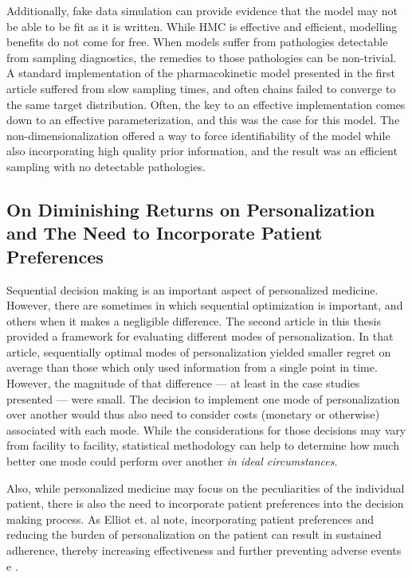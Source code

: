 Additionally, fake data simulation can provide evidence that the model may not be able to be fit as it is written.  While HMC is effective and efficient, modelling benefits do not come for free.  When models suffer from pathologies detectable from sampling diagnostics, the remedies to those pathologies can be non-trivial. A standard implementation of the pharmacokinetic model presented in the first article suffered from slow sampling times, and often chains failed to converge to the same target distribution.  Often, the key to an effective implementation comes down to an effective parameterization, and this was the case for this model.  The non-dimensionalization offered a way to force identifiability of the model while also incorporating high quality prior information, and the result was an efficient sampling with no detectable pathologies.

\subsection{On Diminishing Returns on Personalization and The Need to Incorporate Patient Preferences}

Sequential decision making is an important aspect of personalized medicine.  However, there are sometimes in which sequential optimization is important, and others when it makes a negligible difference.  The second article in this thesis  provided a framework for evaluating different modes of personalization.  In that article, sequentially optimal modes of personalization yielded smaller regret on average than those which only used information from a single point in time.  However, the magnitude of that difference --- at least in the case studies presented --- were small.  The decision to implement one mode of personalization over another would thus also need to consider costs (monetary or otherwise) associated with each mode. While the considerations for those decisions may vary from facility to facility, statistical methodology can help to determine how much better one mode could perform over another \textit{in ideal circumstances}.

Also, while personalized medicine may focus on the peculiarities of the individual patient, there is also the need to incorporate patient preferences into the decision making process.  As Elliot et. al note, incorporating patient preferences and reducing the burden of personalization on the patient can result in sustained adherence, thereby increasing effectiveness and further preventing adverse events e \cite{elliott2008understanding}.  

